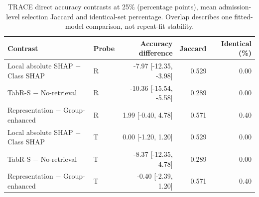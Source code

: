 \begin{table}[!tbp]\centering\scriptsize
\caption{TRACE direct accuracy contrasts at 25\% (percentage points), mean admission-level selection Jaccard and identical-set percentage. Overlap describes one fitted-model comparison, not repeat-fit stability.}\label{tab:trace-selection-contrasts}
\begin{tabular}{llrrr}\toprule
Contrast & Probe & Accuracy difference & Jaccard & Identical (\%) \\ \midrule
Local absolute SHAP $-$ Class SHAP & R & -7.97 [-12.35, -3.98] & 0.529 & 0.00 \\
TabR-S $-$ No-retrieval & R & -10.36 [-15.54, -5.58] & 0.289 & 0.00 \\
Representation $-$ Group-enhanced & R & 1.99 [-0.40, 4.78] & 0.571 & 0.40 \\
Local absolute SHAP $-$ Class SHAP & T & 0.00 [-1.20, 1.20] & 0.529 & 0.00 \\
TabR-S $-$ No-retrieval & T & -8.37 [-12.35, -4.78] & 0.289 & 0.00 \\
Representation $-$ Group-enhanced & T & -0.40 [-2.39, 1.20] & 0.571 & 0.40 \\
\bottomrule\end{tabular}
\end{table}
